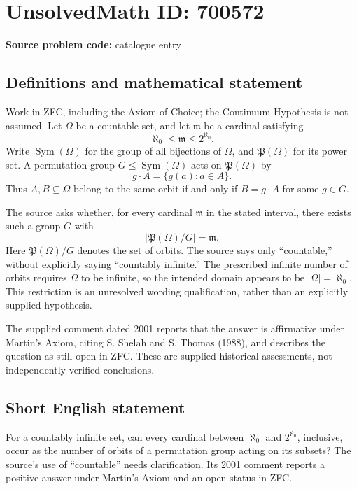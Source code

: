 \documentclass[11pt]{article}
\begin{document}
\section*{UnsolvedMath ID: 700572}
\textbf{Source problem code:} catalogue entry
\subsection{Definitions and mathematical statement}
Work in ZFC, including the Axiom of Choice; the Continuum Hypothesis is not assumed. Let \(\Omega\) be a countable set, and let \(\mathfrak m\) be a cardinal satisfying
\[
\aleph_0\leq\mathfrak m\leq 2^{\aleph_0}.
\]
Write \(\operatorname{Sym}(\Omega)\) for the group of all bijections of \(\Omega\), and \(\mathfrak P(\Omega)\) for its power set. A permutation group \(G\leq\operatorname{Sym}(\Omega)\) acts on \(\mathfrak P(\Omega)\) by
\[
g\cdot A=\{g(a):a\in A\}.
\]
Thus \(A,B\subseteq\Omega\) belong to the same orbit if and only if \(B=g\cdot A\) for some \(g\in G\).

The source asks whether, for every cardinal \(\mathfrak m\) in the stated interval, there exists such a group \(G\) with
\[
\left|\mathfrak P(\Omega)/G\right|=\mathfrak m.
\]
Here \(\mathfrak P(\Omega)/G\) denotes the set of orbits. The source says only ``countable,'' without explicitly saying ``countably infinite.'' The prescribed infinite number of orbits requires \(\Omega\) to be infinite, so the intended domain appears to be \(|\Omega|=\aleph_0\). This restriction is an unresolved wording qualification, rather than an explicitly supplied hypothesis.

The supplied comment dated 2001 reports that the answer is affirmative under Martin's Axiom, citing S. Shelah and S. Thomas (1988), and describes the question as still open in ZFC. These are supplied historical assessments, not independently verified conclusions.
\subsection{Short English statement}
For a countably infinite set, can every cardinal between \(\aleph_0\) and \(2^{\aleph_0}\), inclusive, occur as the number of orbits of a permutation group acting on its subsets? The source's use of ``countable'' needs clarification. Its 2001 comment reports a positive answer under Martin's Axiom and an open status in ZFC.
\end{document}

